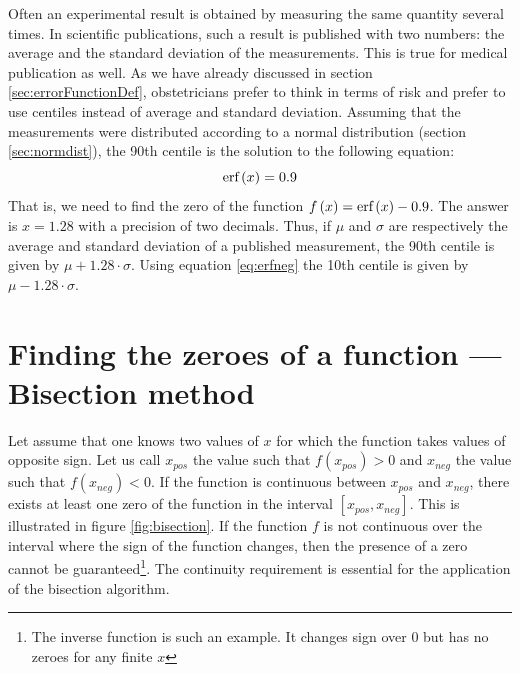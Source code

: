 Often an experimental result is obtained by measuring the same
quantity several times. In scientific publications, such a result
is published with two numbers: the average and the standard
deviation of the measurements. This is true for medical
publication as well. As we have already discussed in section
\ref{sec:errorFunctionDef}, obstetricians prefer to think in terms
of risk and prefer to use centiles instead of average and standard
deviation. Assuming that the measurements were distributed
according to a normal distribution (\cf section
\ref{sec:normdist}), the 90th centile is the solution to the
following equation:
\begin{equation}
\label{eq:centile90}
  \mathop{\textrm{erf}}\left(x\right)=0.9
\end{equation}
That is, we need to find the zero of the function
$f\left(x\right)=\mathop{\textrm{erf}}\left(x\right)-0.9$. The answer is $x=1.28$
with a precision of two decimals. Thus, if $\mu$ and $\sigma$ are
respectively the average and standard deviation of a published
measurement, the 90th centile is given by $\mu+1.28\cdot\sigma$.
Using equation \ref{eq:erfneg} the 10th centile is given by
$\mu-1.28\cdot\sigma$.

\section{Finding the zeroes of a function --- Bisection method}
\label{sec:bisection}
Let assume that one knows two values of $x$ for which the function takes values of
opposite sign. Let us call $x_{pos}$ the value such
that $f\left(x_{pos}\right)>0$ and $x_{neg}$ the value such that $f\left(x_{neg}\right)<0$.
If the function is continuous between $x_{pos}$ and
$x_{neg}$, there exists at least one zero of the
function in the interval $\left[ x_{pos},x_{neg}\right]$. This is illustrated in figure
\ref{fig:bisection}. If the function $f$ is not continuous over
the interval where the sign of the function changes, then the
presence of a zero cannot be guaranteed\footnote{The inverse
function is such an example. It changes sign over 0 but has no
zeroes for any finite $x$}. The continuity requirement is
essential for the application of the bisection algorithm.

